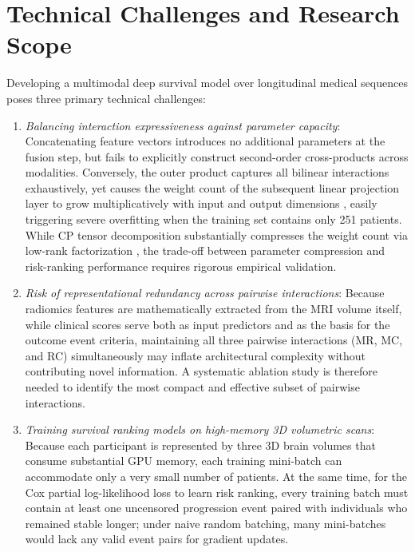 \section{Technical Challenges and Research Scope}
Developing a multimodal deep survival model over longitudinal medical sequences poses three primary technical challenges:
\begin{enumerate}
\item \emph{Balancing interaction expressiveness against parameter capacity}: Concatenating feature vectors introduces no additional parameters at the fusion step, but fails to explicitly construct second-order cross-products across modalities. Conversely, the outer product captures all bilinear interactions exhaustively, yet causes the weight count of the subsequent linear projection layer to grow multiplicatively with input and output dimensions \cite{zadeh2017tensor,liu2018lowrank}, easily triggering severe overfitting when the training set contains only 251 patients. While CP tensor decomposition substantially compresses the weight count via low-rank factorization \cite{kolda2009tensor,liu2018lowrank}, the trade-off between parameter compression and risk-ranking performance requires rigorous empirical validation.
\item \emph{Risk of representational redundancy across pairwise interactions}: Because radiomics features are mathematically extracted from the MRI volume itself, while clinical scores serve both as input predictors and as the basis for the outcome event criteria, maintaining all three pairwise interactions (MR, MC, and RC) simultaneously may inflate architectural complexity without contributing novel information. A systematic ablation study is therefore needed to identify the most compact and effective subset of pairwise interactions.
\item \emph{Training survival ranking models on high-memory 3D volumetric scans}: Because each participant is represented by three 3D brain volumes that consume substantial GPU memory, each training mini-batch can accommodate only a very small number of patients. At the same time, for the Cox partial log-likelihood loss to learn risk ranking, every training batch must contain at least one uncensored progression event paired with individuals who remained stable longer; under naive random batching, many mini-batches would lack any valid event pairs for gradient updates.
\end{enumerate}

